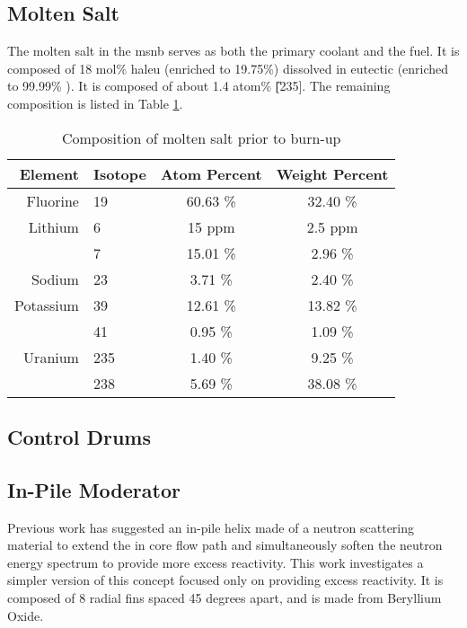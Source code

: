 \subsection{Molten Salt}
The molten salt in the \acs{msnb} serves as both the primary coolant and the fuel. It is composed of 18 mol\% \acs{haleu} \UF \; (enriched to 19.75\%) dissolved in eutectic \flinak (enriched to 99.99\% \Li[7]). It is composed of about 1.4 atom\% \U[235]. The remaining composition is listed in Table \ref{tab:saltcomp}.

\begin{table}[!ht]
    \caption[Molten salt composition]{Composition of molten salt prior to burn-up}
    \centering
    \begin{tabular}{rl|cc}
     Element&Isotope&Atom Percent & Weight Percent \\ \hline
     Fluorine  & 19  & 60.63 \%  & 32.40 \% \\  \hline
     Lithium   & 6   & 15 ppm    & 2.5 ppm  \\
               & 7   & 15.01 \%  & 2.96 \%  \\ \hline
     Sodium    & 23  &  3.71 \%  & 2.40 \%  \\ \hline
     Potassium & 39  & 12.61 \%  & 13.82 \% \\
               & 41  & 0.95 \%  & 1.09 \%  \\ \hline
    Uranium    & 235 & 1.40 \%   & 9.25 \%  \\
               & 238 & 5.69 \%   & 38.08 \% \\
    \end{tabular}
    \label{tab:saltcomp}
\end{table}

\subsection{Control Drums}


\subsection{In-Pile Moderator}
Previous work \cite{CarterPHD} has suggested an in-pile helix made of a neutron scattering material to extend the in core flow path and simultaneously soften the neutron energy spectrum to provide more excess reactivity. This work investigates a simpler version of this concept focused only on providing excess reactivity. It is composed of 8 radial fins spaced 45 degrees apart, and is made from Beryllium Oxide.


